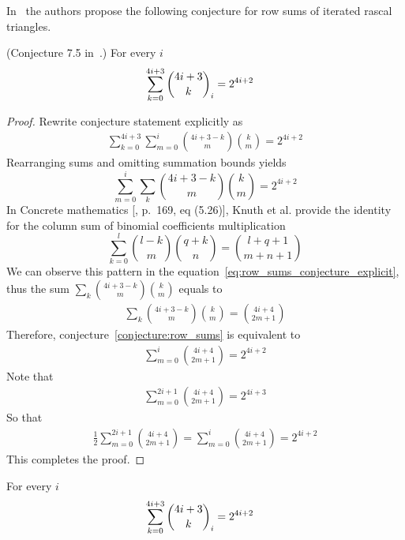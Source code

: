 ﻿In~\cite{gregory2023iterated} the authors
propose the following conjecture for row sums of iterated rascal triangles.
\begin{conj}
    \label{conjecture:row_sums}
    (Conjecture 7.5 in~\cite{gregory2023iterated}.)
    For every $i$
    \begin{align*}
        \sum_{k=0}^{4i+3} \binom{4i+3}{k}_{i} &= 2^{4i+2}
    \end{align*}
\end{conj}
\begin{proof}
    Rewrite conjecture statement explicitly as
    \begin{align*}
        \sum_{k=0}^{4i+3} \sum_{m=0}^{i} \binom{4i+3-k}{m} \binom{k}{m} = 2^{4i+2}
    \end{align*}
    Rearranging sums and omitting summation bounds yields
    \begin{equation}
        \sum_{m=0}^{i}  \sum_{k} \binom{4i+3-k}{m} \binom{k}{m} = 2^{4i+2}\label{eq:row_sums_conjecture_explicit}
    \end{equation}
    In Concrete mathematics [\cite{graham1994concrete}, p.\ 169, eq (5.26)], Knuth et al.
    provide the identity for the column sum of binomial coefficients multiplication
    \begin{equation}
        \label{eq:knuth-column-sum}
        \sum_{k=0}^{l} \binom{l-k}{m} \binom{q+k}{n} = \binom{l+q+1}{m+n+1}
    \end{equation}
    We can observe this pattern in the equation~\eqref{eq:row_sums_conjecture_explicit},
    thus the sum $\sum_{k} \binom{4i+3-k}{m} \binom{k}{m}$ equals to
    \begin{align*}
        \sum_{k} \binom{4i+3-k}{m} \binom{k}{m} = \binom{4i+4}{2m+1}
    \end{align*}
    Therefore, conjecture~\eqref{conjecture:row_sums} is equivalent to
    \begin{align*}
        \sum_{m=0}^{i} \binom{4i+4}{2m+1} = 2^{4i+2}
    \end{align*}
    Note that
    \begin{align*}
        \sum_{m=0}^{2i+1} \binom{4i+4}{2m+1} = 2^{4i+3}
    \end{align*}
    So that
    \begin{align*}
        \frac{1}{2} \sum_{m=0}^{2i+1} \binom{4i+4}{2m+1} = \sum_{m=0}^{i} \binom{4i+4}{2m+1} = 2^{4i+2}
    \end{align*}
    This completes the proof.
\end{proof}
\begin{proposition}
    For every $i$
    \begin{align*}
        \sum_{k=0}^{4i+3} \binom{4i+3}{k}_{i} &= 2^{4i+2}
    \end{align*}
\end{proposition}
